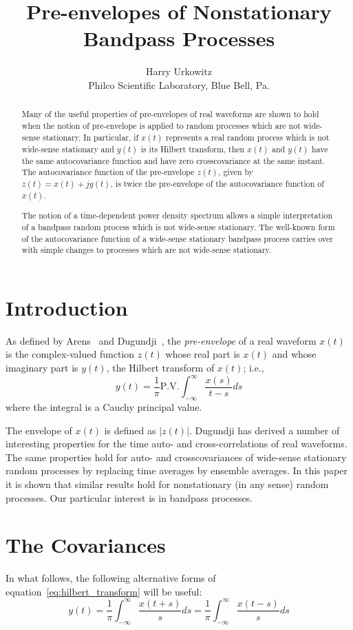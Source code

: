 \documentclass[12pt]{article}
\title{Pre-envelopes of Nonstationary Bandpass Processes}
\author{Harry Urkowitz\\
Philco Scientific Laboratory, Blue Bell, Pa.}
\date{}
\begin{document}
\maketitle

\begin{abstract}
Many of the useful properties of pre-envelopes of real waveforms are shown to hold when the notion of pre-envelope is applied to random processes which are not wide-sense stationary. In particular, if $x(t)$ represents a real random process which is not wide-sense stationary and $y(t)$ is its Hilbert transform, then $x(t)$ and $y(t)$ have the same autocovariance function and have zero crosscovariance at the same instant. The autocovariance function of the pre-envelope $z(t)$, given by $z(t) = x(t) + jy(t)$, is twice the pre-envelope of the autocovariance function of $x(t)$.

The notion of a time-dependent power density spectrum allows a simple interpretation of a bandpass random process which is not wide-sense stationary. The well-known form of the autocovariance function of a wide-sense stationary bandpass process carries over with simple changes to processes which are not wide-sense stationary.
\end{abstract}

\section{Introduction}
As defined by Arens~\cite{arens1957} and Dugundji~\cite{dugundji1958}, the \emph{pre-envelope} of a real waveform $x(t)$ is the complex-valued function $z(t)$ whose real part is $x(t)$ and whose imaginary part is $y(t)$, the Hilbert transform of $x(t)$; i.e.,
\begin{equation}
y(t) = \frac{1}{\pi} \mathrm{P.V.} \int_{-\infty}^{\infty} \frac{x(s)}{t-s} ds
\label{eq:hilbert_transform}
\end{equation}
where the integral is a Cauchy principal value.

The envelope of $x(t)$ is defined as $|z(t)|$. Dugundji has derived a number of interesting properties for the time auto- and cross-correlations of real waveforms. The same properties hold for auto- and crosscovariances of wide-sense stationary random processes by replacing time averages by ensemble averages. In this paper it is shown that similar results hold for nonstationary (in any sense) random processes. Our particular interest is in bandpass processes.

\section{The Covariances}
In what follows, the following alternative forms of equation~\eqref{eq:hilbert_transform} will be useful:
\begin{equation}
y(t) = \frac{1}{\pi} \int_{-\infty}^{\infty} \frac{x(t+s)}{s} ds = \frac{1}{\pi} \int_{-\infty}^{\infty} \frac{x(t-s)}{s} ds
\label{eq:hilbert_transform_alt}
\end{equation}
\end{document}

